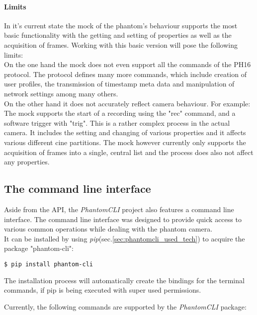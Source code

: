 \paragraph{Limits}
In it's current state the mock of the phantom's behaviour supports the most basic functionality with the getting and setting of properties as well as the acquisition of frames. Working with this basic version will pose the following limits:\\
On the one hand the mock does not even support all the commands of the PH16 protocol. The protocol defines many more commands, which include creation of user profiles, the transmission of timestamp meta data and manipulation of network settings among many others.\\
On the other hand it does not accurately reflect camera behaviour. For example: The mock supports the start of a recording using the "rec" command, and a software trigger with "trig". This is a rather complex process in the actual camera. It includes the setting and changing of various properties and it affects various different cine partitions. The mock however currently only supports the acquisition of frames into a single, central list and the process does also not affect any properties.\\

\subsection{The command line interface}

Aside from the API, the \textit{PhantomCLI} project also features a command line interface. The command line interface was designed to provide quick access to various common operations while dealing with the phantom camera.\\
It can be installed by using \textit{pip}(sec.\ref{sec:phantomcli_used_tech}) to acquire the package "phantom-cli":

\begin{lstlisting}
$ pip install phantom-cli
\end{lstlisting}

The installation process will automatically create the bindings for the terminal commands, if pip is being executed with super used permissions.\par

Currently, the following commands are supported by the \textit{PhantomCLI} package:
